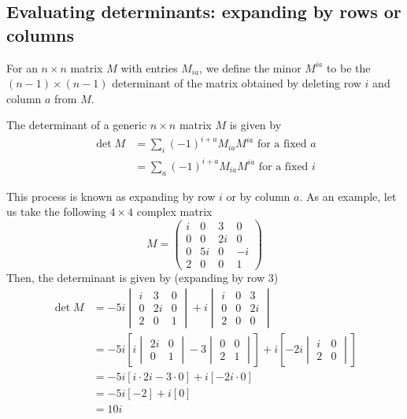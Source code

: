 \subsection{Evaluating determinants: expanding by rows or columns}
For an \(n \times n\) matrix \(M\) with entries \(M_{ia}\), we define the minor \(M^{ia}\) to be the \((n-1)\times(n-1)\) determinant of the matrix obtained by deleting row \(i\) and column \(a\) from \(M\).
\begin{proposition}
	The determinant of a generic \(n \times n\) matrix \(M\) is given by
	\begin{align*}
		\det M
		 & = \sum_i (-1)^{i+a} M_{ia} M^{ia} \text{ for a fixed \(a\)} \\
		 & = \sum_a (-1)^{i+a} M_{ia} M^{ia} \text{ for a fixed \(i\)}
	\end{align*}
\end{proposition}
This process is known as expanding by row \(i\) or by column \(a\).
As an example, let us take the following \(4 \times 4\) complex matrix
\[
	M = \begin{pmatrix}
		i & 0  & 3  & 0  \\
		0 & 0  & 2i & 0  \\
		0 & 5i & 0  & -i \\
		2 & 0  & 0  & 1
	\end{pmatrix}
\]
Then, the determinant is given by (expanding by row 3)
\begin{align*}
	\det M
	 & = -5i\begin{vmatrix}
		i & 3  & 0 \\
		0 & 2i & 0 \\
		2 & 0  & 1
	\end{vmatrix} + i\begin{vmatrix}
		i & 0 & 3  \\
		0 & 0 & 2i \\
		2 & 0 & 0
	\end{vmatrix}                                                              \\
	 & = -5i\left[i\begin{vmatrix}
			2i & 0 \\
			0  & 1
		\end{vmatrix} - 3 \begin{vmatrix}
			0 & 0 \\
			2 & 1
		\end{vmatrix}\right] + i\left[-2i\begin{vmatrix}
			i & 0 \\
			2 & 0
		\end{vmatrix}\right] \\
	 & = -5i[i \cdot 2i - 3 \cdot 0] + i[-2i \cdot 0]                                                                             \\
	 & = -5i[-2] + i[0]                                                                                                           \\
	 & = 10i
\end{align*}
